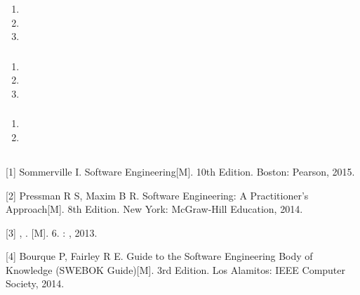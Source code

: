 \subsubsection{}\label{section-23}

\begin{enumerate}
\def\labelenumi{\arabic{enumi}.}
\tightlist
\item
\item
\item
\end{enumerate}

\subsubsection{}\label{section-24}

\begin{enumerate}
\def\labelenumi{\arabic{enumi}.}
\tightlist
\item
\item
\item
\end{enumerate}

\subsubsection{}\label{section-25}

\begin{enumerate}
\def\labelenumi{\arabic{enumi}.}
\tightlist
\item
\item
\end{enumerate}

\subsection{}\label{section-26}

\subsection{}\label{section-27}

{[}1{]} Sommerville I. Software Engineering{[}M{]}. 10th Edition.
Boston: Pearson, 2015.

{[}2{]} Pressman R S, Maxim B R. Software Engineering: A Practitioner's
Approach{[}M{]}. 8th Edition. New York: McGraw-Hill Education, 2014.

{[}3{]} , . {[}M{]}. 6. : , 2013.

{[}4{]} Bourque P, Fairley R E. Guide to the Software Engineering Body
of Knowledge (SWEBOK Guide){[}M{]}. 3rd Edition. Los Alamitos: IEEE
Computer Society, 2014.

